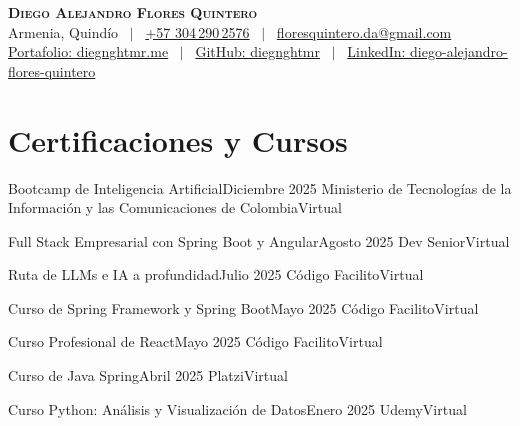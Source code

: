 \documentclass[letterpaper,12pt]{fed-res}
\begin{document}
\begin{center}
    \textbf{\Huge \scshape Diego Alejandro Flores Quintero} \\ \vspace{1pt}
    Armenia, Quindío \ $|$ \
    \href{http://wa.me/+573042902576}{+57 304\,290\,2576} \ $|$ \
    \href{mailto:floresquintero.da@gmail.com}{floresquintero.da@gmail.com} \\[1pt]
    \href{https://www.diegnghtmr.me}{Portafolio: diegnghtmr.me} \ $|$ \
    \href{https://github.com/diegnghtmr}{GitHub: diegnghtmr} \ $|$ \
    \href{https://www.linkedin.com/in/diego-alejandro-flores-quintero/}{LinkedIn: diego-alejandro-flores-quintero}
\end{center}


\section{Certificaciones y Cursos}
\resumeSubHeadingListStart
    \resumeSubheading
            {Bootcamp de Inteligencia Artificial}{Diciembre 2025}
            {Ministerio de Tecnologías de la Información y las Comunicaciones de Colombia}{Virtual}
            
    \resumeSubheading
            {Full Stack Empresarial con Spring Boot y Angular}{Agosto 2025}
            {Dev Senior}{Virtual}

    \resumeSubheading
        {Ruta de LLMs e IA a profundidad}{Julio 2025}
        {Código Facilito}{Virtual}

    \resumeSubheading
        {Curso de Spring Framework y Spring Boot}{Mayo 2025}
        {Código Facilito}{Virtual}

    \resumeSubheading
        {Curso Profesional de React}{Mayo 2025}
        {Código Facilito}{Virtual}

    \resumeSubheading
        {Curso de Java Spring}{Abril 2025}
        {Platzi}{Virtual}

    \resumeSubheading
        {Curso Python: Análisis y Visualización de Datos}{Enero 2025}
        {Udemy}{Virtual}
\end{document}
